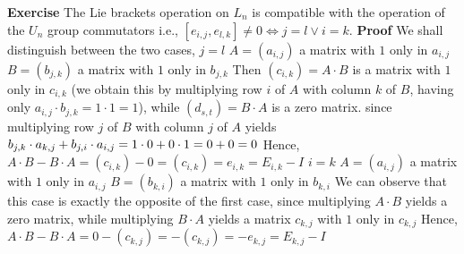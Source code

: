 \documentclass[12pt]{article}
\begin{document}
\textbf{Exercise} The Lie brackets operation on \( L_{n} \) is compatible \newline
with the operation of the $U_n$ group commutators \newline
i.e., $[e_{i,j},e_{l,k}] \neq 0 \Leftrightarrow j=l \lor i=k$. \newline
\textbf{Proof} \newline
We shall distinguish between the two cases,\newline
\underline{\textbf{$j=l$}} \newline
$A=(a_{i,j})$ a matrix with $1$ only in $a_{i,j}$ \newline
$B=(b_{j,k})$ a matrix with $1$ only in $b_{j,k}$ \newline
Then $(c_{i,k})=A \cdot B$ is a matrix with $1$ only in $c_{i,k}$ \newline
(we obtain this by multiplying row $i$ of $A$ with column $k$ of $B$, having only $a_{i,j} \cdot b_{j,k}=1 \cdot 1=1$), \newline
while $(d_{s,t})=B \cdot A$ is a zero matrix. since multiplying row $j$ of $B$ with column $j$ of $A$ yields $b_{j,k} \cdot a_{k,j}+b_{j,i} \cdot a_{i,j}=\newline
1 \cdot 0+0 \cdot 1=0+0=0$ \newline
Hence, $A \cdot B-B \cdot A=(c_{i,k})-0=(c_{i,k})=e_{i,k}=E_{i,k}-I$ \newline \newline
\underline{\textbf{$i=k$}} \newline
$A=(a_{i,j})$ a matrix with $1$ only in $a_{i,j}$ \newline
$B=(b_{k,i})$ a matrix with $1$ only in $b_{k,i}$ \newline
We can observe that this case is exactly the opposite of the first case, \newline
since multiplying $A \cdot B$ yields a zero matrix, while multiplying \newline
$B \cdot A$ yields a matrix $c_{k,j}$ with $1$ only in $c_{k,j}$ \newline
Hence, $A \cdot B-B \cdot A=0-(c_{k,j})=-(c_{k,j})=-e_{k,j}=E_{k,j}-I$ \newline
\end{document}
